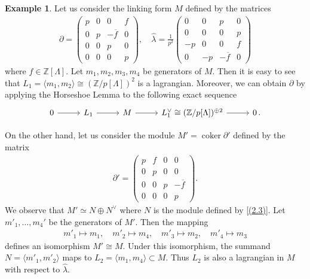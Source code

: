 \documentclass[sn-mathphys-num]{sn-jnl}
\theoremstyle{definition}
\newtheorem{example}[lemma]{Example}
\numberwithin{equation}{section}
\theoremstyle{definition}
\def\pd{\partial}
\def\IZ{{\mathbb{Z}}}
\def\La{{\Lambda}}
\def\hl{{\hat \lambda}}
\def\coker{\operatorname{coker}}
\begin{document}
\begin{example}\label{example_4}
 Let us consider the linking form $M$ defined by the matrices
\begin{align}  \partial = \begin{pmatrix} p & 0 & 0 & f \\ 0 & p & -\overline{f} & 0 \\ 0 & 0 & p & 0 \\ 0 & 0 & 0 & p \end{pmatrix}, \quad \hl = \frac{1}{p^2} \begin{pmatrix} 0 & 0 & p & 0 \\ 0 & 0 & 0 & p \\ -p & 0 & 0 & f \\ 0 & -p & -\overline{f} & 0 \end{pmatrix} 
\end{align} 
where $ f \in \mathbb{Z}[\La]$. Let $m_1, m_2, m_3, m_4$ be generators of $M$. Then it is easy to see that $L_1 = \langle m_1, m_2 \rangle \cong (\mathbb{Z}/p[\Lambda])^2$ is a lagrangian. Moreover, we can obtain $\pd$ by applying the Horseshoe Lemma to the following exact sequence
\begin{align}
\begin{tikzcd}[ampersand replacement=\&, column sep=27pt]
	0 \arrow[r]\& L_1  \arrow[r] \& M \arrow[r] \& L_1^{\vee}\cong (\IZ/p[\La])^{\oplus 2}\arrow[r] \& 0\,.
    \end{tikzcd}    
\end{align}

On the other hand, let us consider the module $M'=\coker \pd'$ defined by the matrix
\begin{align} 
\partial' = \begin{pmatrix} p & f & 0 & 0 \\ 0 & p & 0 & 0 \\ 0 & 0 & p & -\overline{f} \\ 0 & 0 & 0 & p \end{pmatrix}. 
\end{align}
We observe that $M' \simeq N \oplus N^\vee$ where $N$ is the module defined by \eqref{(2.3)}. Let $m'_1,\ldots, m_4'$ be the generators of $M'$. Then the mapping
\begin{align}  m'_1 \mapsto m_1, \quad m'_2 \mapsto m_4, \quad m'_3 \mapsto m_2, \quad m'_4 \mapsto m_3 
\end{align}
defines an isomorphism $M' \cong M$. Under this isomorphism, the summand $N=\langle m'_1,m'_2\rangle$ maps to $L_2=\langle m_1,m_4\rangle\subset M$. Thus $L_2$ is also a lagrangian in $M$ with respect to $\hl$.
\end{example}
\end{document}
